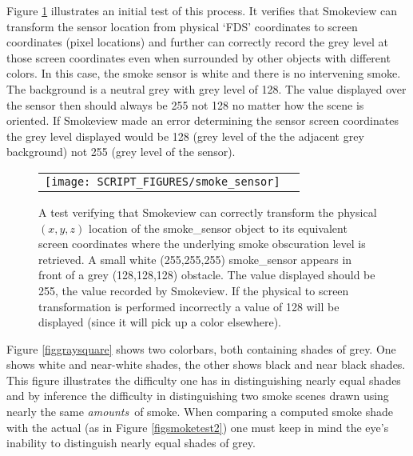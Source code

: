 \documentclass[11pt,twoside]{book}
\begin{document}
Figure \ref{figsmokesensor} illustrates an initial test of this process.  It verifies that Smokeview can transform the sensor location from physical `FDS' coordinates to screen coordinates (pixel locations) and further can correctly record the grey level at those screen coordinates even when surrounded by other objects with different colors.  In this case, the smoke sensor is white and there is no intervening smoke.  The background is a neutral grey with grey level of 128.  The value displayed over the sensor then should always be 255 not 128 no matter how the scene is oriented.  If Smokeview made an error determining the sensor screen coordinates the grey level displayed would be 128 (grey level of the the adjacent grey background) not 255 (grey level of the sensor).


\begin{figure}[\figoptions]
\begin{center}
 \centering
\begin{tabular}{cc}
\texttt{[image: SCRIPT\_FIGURES/smoke\_sensor]}&
 \end{tabular}
\end{center}
\caption[A test verifying that the Smokeview smoke\_sensor object is working properly]
{A test verifying that Smokeview can correctly transform the physical $(x,y,z)$ location of the smoke\_sensor object to its equivalent screen coordinates where the underlying smoke obscuration level is retrieved. A small white (255,255,255) smoke\_sensor appears in front of a grey (128,128,128) obstacle. The value displayed should be 255,  the value recorded by Smokeview.  If the physical to screen transformation is performed incorrectly a value of 128 will be displayed (since it will pick up a color elsewhere).
}
\label{figsmokesensor}%
\end{figure}

Figure \ref{figgraysquare} shows two colorbars, both containing shades of grey.  One shows white and near-white shades, the other shows black and near black shades.  This figure illustrates the difficulty one has in distinguishing nearly equal shades and by inference the difficulty in distinguishing two smoke scenes drawn using nearly the same {\em amounts}\ of smoke.  When comparing a computed smoke shade with the actual (as in Figure \ref{figsmoketest2}) one must keep in mind the eye's inability to distinguish nearly equal shades of grey.
\end{document}
